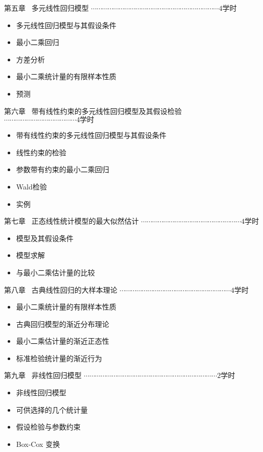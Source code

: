 \noindent 第五章 \ 多元线性回归模型
$ \cdots\cdots\cdots\cdots\cdots\cdots\cdots\cdots\cdots\cdots\cdots\cdots\cdots\cdots\cdots
\cdots\cdots\cdots\cdots\cdots\cdots\cdots\cdots \text{4学时} $
\begin{itemize}
	\setlength{\itemsep}{-2pt}	
	\item 多元线性回归模型与其假设条件
	\item 最小二乘回归
	\item 方差分析
	\item 最小二乘统计量的有限样本性质
	\item 预测	
\end{itemize}	
	
\noindent 第六章 \ 带有线性约束的多元线性回归模型及其假设检验
$ \cdots\cdots\cdots\cdots\cdots\cdots\cdots\cdots\cdots\cdots\cdots\cdots\cdots
 \text{4学时} $
\begin{itemize}
	\setlength{\itemsep}{-2pt}	
	\item 带有线性约束的多元线性回归模型与其假设条件
	\item 线性约束的检验
	\item 参数带有约束的最小二乘回归
	\item Wald检验
	\item 实例	
\end{itemize}	

\noindent 第七章 \ 正态线性统计模型的最大似然估计
$ \cdots\cdots\cdots\cdots\cdots\cdots\cdots\cdots\cdots\cdots\cdots\cdots\cdots\cdots\cdots
\cdots\cdots\cdots \text{4学时} $
\begin{itemize}
	\setlength{\itemsep}{-2pt}	
	\item 模型及其假设条件
	\item 模型求解
	\item 与最小二乘估计量的比较	
\end{itemize}		
	
\noindent 第八章 \ 古典线性回归的大样本理论
$ \cdots\cdots\cdots\cdots\cdots\cdots\cdots\cdots\cdots\cdots\cdots\cdots\cdots\cdots\cdots
\cdots\cdots\cdots\cdots\cdots \text{4学时} $
\begin{itemize}
	\setlength{\itemsep}{-2pt}
	\item 最小二乘统计量的有限样本性质
	\item 古典回归模型的渐近分布理论
	\item 最小二乘估计量的渐近正态性
	\item 标准检验统计量的渐近行为
\end{itemize}	
	
\noindent 第九章 \ 非线性回归模型
$ \cdots\cdots\cdots\cdots\cdots\cdots\cdots\cdots\cdots\cdots\cdots\cdots\cdots\cdots\cdots
\cdots\cdots\cdots\cdots\cdots\cdots\cdots\cdots\cdots \text{2学时} $
\begin{itemize}
	\setlength{\itemsep}{-2pt}
	\item 非线性回归模型
	\item 可供选择的几个统计量
	\item 假设检验与参数约束
	\item Box-Cox 变换
\end{itemize}		
	

